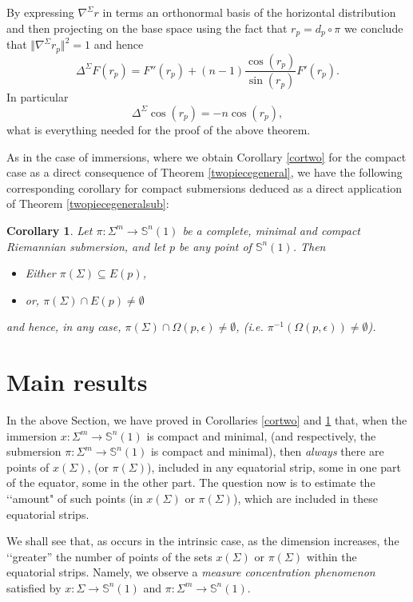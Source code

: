 \documentclass{amsart}
\newtheorem{corollary}[theorem]{Corollary}
\theoremstyle{definition}
\theoremstyle{remark}
\begin{document}
By expressing $\nabla^\Sigma r$ in terms an orthonormal basis of the horizontal distribution and then projecting on the base space using the fact that $r_p=d_p\circ \pi$ we conclude that $\Vert \nabla^\Sigma r_p\Vert^2=1$ and hence 
\begin{equation}\label{eq:lapsub}
    \Delta^\Sigma F(r_p)=F''(r_p)+(n-1) \frac{\cos(r_p)}{\sin(r_p)} F'(r_p).
\end{equation}
In particular
$$
\Delta^\Sigma \cos(r_p)=-n \cos(r_p),
$$
what is everything needed for the proof of the above theorem. 

As in the case of immersions, where we obtain Corollary \ref{cortwo} for the compact case as a direct consequence of Theorem \ref{twopiecegeneral}, we have the following corresponding corollary for compact submersions deduced as a direct application of Theorem \ref{twopiecegeneralsub}:
\begin{corollary}\label{cortwoSub}
	Let $\pi:\Sigma^m \to \mathbb{S}^n(1)$ be a complete, minimal and compact Riemannian submersion, and let $p$ be any point of $\mathbb{S}^n(1)$.  Then
    \begin{itemize}
        \item Either $\pi(\Sigma)\subseteq E(p)$, 
        \item or, $\pi(\Sigma)\cap E(p)\neq \emptyset$
            \end{itemize}
            and  hence, in any case,  $\pi(\Sigma) \cap \Omega(p,\epsilon) \neq \emptyset$, (i.e. $\pi^{-1}(\Omega(p,\epsilon))\neq \emptyset$).
\end{corollary}
\section{Main results}

In the above Section, we have proved in Corollaries \ref{cortwo} and \ref{cortwoSub} that, when the immersion $x: \Sigma^m \to \mathbb{S}^n(1)$ is  compact and minimal, (and respectively, the submersion $\pi:\Sigma^m \to \mathbb{S}^n(1)$ is compact and minimal), then \emph{always} there are points of $x(\Sigma)$, (or $\pi(\Sigma)$), included in any equatorial strip, some in one part of the equator, some in the other part. The question now is to estimate the \lq\lq amount" of such points (in $x(\Sigma)$ or $\pi(\Sigma)$),  which are included in these equatorial strips. 

We shall see that, as occurs in the intrinsic case, as the dimension increases, the \lq\lq greater'' the number of points of the sets $x(\Sigma)$ or $\pi(\Sigma)$ within the equatorial strips. Namely, we observe a \emph{measure concentration phenomenon} satisfied by $x: \Sigma\to \mathbb{S}^n(1)$ and $\pi:\Sigma^m \to \mathbb{S}^n(1)$.
\end{document}
